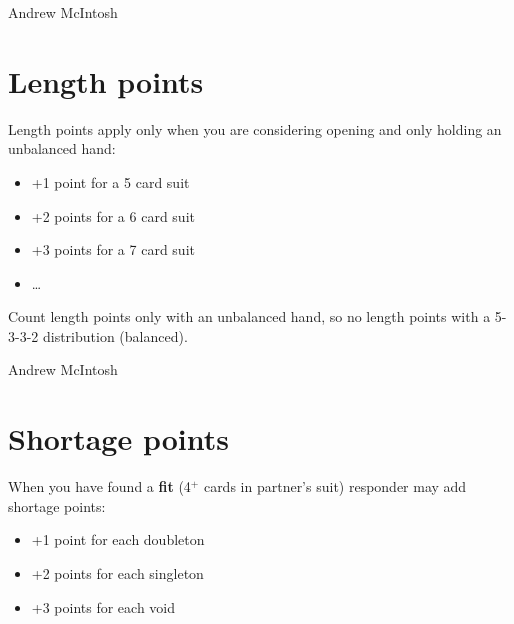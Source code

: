 \documentclass[14pt]{extarticle}
\begin{document}
\vspace*{\fill}
\begin{flushbottom}
 \begin{center}
 \tiny
 \textcopyright Andrew McIntosh
\end{center}
\end{flushbottom}

 

\newpage
\addtocounter{page}{3}
\vspace*{\fill}
\begingroup
\centering


\section*{Length points}
\endgroup
\noindent Length points apply only when you are considering opening and only holding an unbalanced hand:\\
\begin{itemize}
\item +1 point for a 5 card suit
\item +2 points for a 6 card suit
\item +3 points for a 7 card suit
\item \ldots
\end{itemize}
\begingroup
\centering
Count length points only with an unbalanced hand, so no length points with a 5-3-3-2 distribution (balanced).
\endgroup


\vspace*{\fill}
\begin{flushbottom}
 \begin{center}
 \tiny
 \textcopyright Andrew McIntosh
\end{center}
\end{flushbottom}


\newpage
\addtocounter{page}{2}
\vspace*{\fill}
\begingroup
\centering

\section*{Shortage points}
\endgroup
\noindent When you have found a \textbf{fit} (4$^{+}$ cards in partner's suit) responder may add shortage points:\\
\begin{itemize}
\item +1 point for each doubleton
\item +2 points for each singleton
\item +3 points for each void
\end{itemize}
\end{document}
